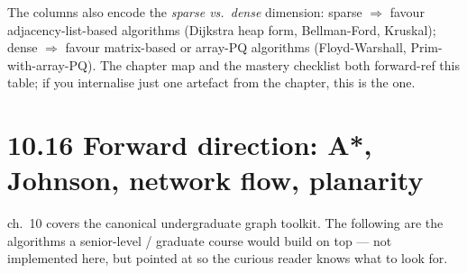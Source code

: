 \documentclass[11pt]{article}
\begin{document}
The columns also encode the \emph{sparse vs.\ dense} dimension:
sparse $\Rightarrow$ favour adjacency-list-based algorithms
(Dijkstra heap form, Bellman-Ford, Kruskal); dense $\Rightarrow$
favour matrix-based or array-PQ algorithms (Floyd-Warshall,
Prim-with-array-PQ). The chapter map and the mastery checklist
both forward-ref this table; if you internalise just one artefact
from the chapter, this is the one.

\section{10.16 Forward direction: A*, Johnson, network flow, planarity}

ch.~10 covers the canonical undergraduate graph toolkit. The
following are the algorithms a senior-level / graduate course
would build on top --- not implemented here, but pointed at so the
curious reader knows what to look for.
\end{document}
